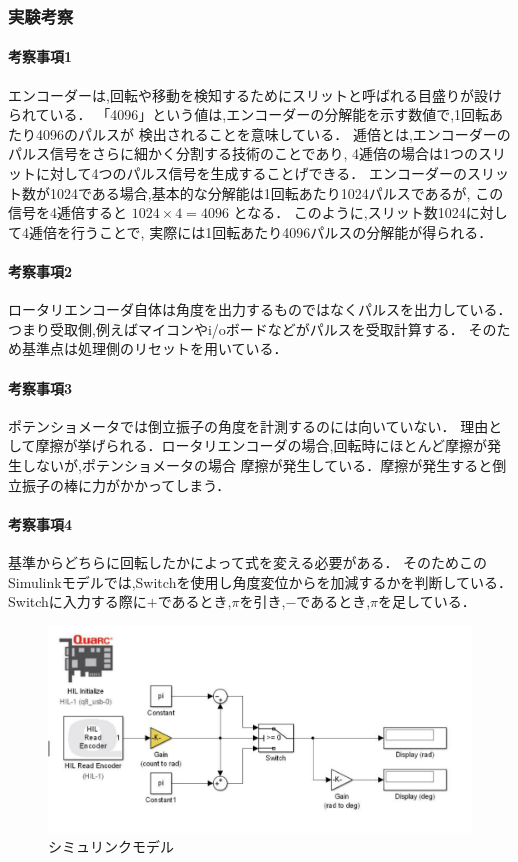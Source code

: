 \subsubsection{実験考察}
\paragraph{考察事項1}
エンコーダーは,回転や移動を検知するためにスリットと呼ばれる目盛りが設けられている．
「4096」という値は,エンコーダーの分解能を示す数値で,1回転あたり4096のパルスが
検出されることを意味している．
逓倍とは,エンコーダーのパルス信号をさらに細かく分割する技術のことであり,
4逓倍の場合は1つのスリットに対して4つのパルス信号を生成することげできる．
エンコーダーのスリット数が1024である場合,基本的な分解能は1回転あたり1024パルスであるが,
この信号を4逓倍すると
\( 1024\times 4=4096 \) となる．
このように,スリット数1024に対して4逓倍を行うことで,
実際には1回転あたり4096パルスの分解能が得られる．

\paragraph{考察事項2}
ロータリエンコーダ自体は角度を出力するものではなくパルスを出力している．
つまり受取側,例えばマイコンやi/oボードなどがパルスを受取計算する．
そのため基準点は処理側のリセットを用いている．


\paragraph{考察事項3}
ポテンショメータでは倒立振子の角度を計測するのには向いていない．
理由として摩擦が挙げられる．ロータリエンコーダの場合,回転時にほとんど摩擦が発生しないが,ポテンショメータの場合
摩擦が発生している．摩擦が発生すると倒立振子の棒に力がかかってしまう．

\paragraph{考察事項4}
基準からどちらに回転したかによって式を変える必要がある．
そのためこのSimulinkモデルでは,Switchを使用し角度変位からを加減するかを判断している．
Switchに入力する際に\( + \)であるとき,\( \pi \)を引き,\( - \)であるとき,\( \pi \)を足している．

\begin{figure}[h]
  \centering
  \includegraphics[scale=0.9]{sozai/pendcount3.pdf}
  \caption{シミュリンクモデル}
\end{figure}


